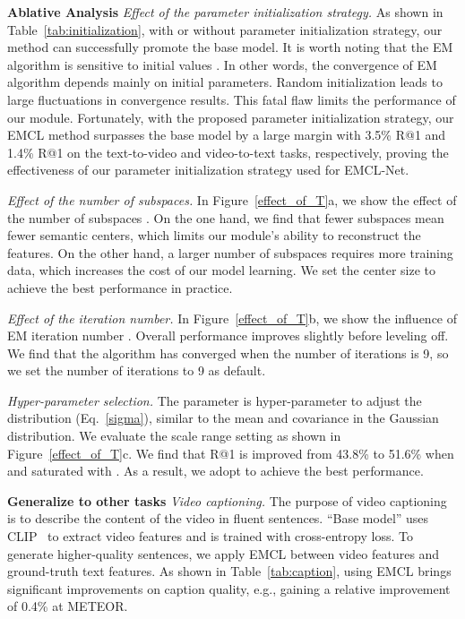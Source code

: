 \documentclass{article}
\newcommand{\myparagraph}[1]{\textbf{#1}\hspace{1.8ex}}
\newcommand{\mysubparagraph}[1]{\textit{#1}\hspace{1.8ex}}
\begin{document}
\myparagraph{Ablative Analysis}
\mysubparagraph{Effect of the parameter initialization strategy.} \label{limit}
As shown in Table~\ref{tab:initialization}, with or without parameter initialization strategy, our method can successfully promote the base model.
It is worth noting that the EM algorithm \cite{dempster1977maximum} is sensitive to initial values \cite{abdolali2021beyond,li2019expectation}. In other words, the convergence of EM algorithm depends mainly on initial parameters. Random initialization leads to large fluctuations in convergence results. This fatal flaw limits the performance of our module. Fortunately, with the proposed parameter initialization strategy, our EMCL method surpasses the base model by a large margin with 3.5\% R@1 and 1.4\% R@1 on the text-to-video and video-to-text tasks, respectively, proving the effectiveness of our parameter initialization strategy used for EMCL-Net. 

\mysubparagraph{Effect of the number of subspaces.} In Figure~\ref{effect_of_T}a, we show the effect of the number of subspaces . On the one hand, we find that fewer subspaces mean fewer semantic centers, which limits our module’s ability to reconstruct the features. On the other hand, a larger number of subspaces requires more training data, which increases the cost of our model learning. We set the center size  
to achieve the best performance in practice.

\mysubparagraph{Effect of the iteration number.} In Figure~\ref{effect_of_T}b, we show the influence of EM iteration number . Overall performance improves slightly before leveling off. We find that the algorithm has converged when the number of iterations is 9, so we set the number of iterations to 9 as default.

\mysubparagraph{Hyper-parameter selection.} The parameter  is hyper-parameter to adjust the distribution (Eq.~\ref{sigma}), similar to the mean and covariance in the Gaussian distribution. We evaluate the scale range setting  as shown in Figure~\ref{effect_of_T}c. We find that R@1 is improved from 43.8\% to 51.6\% when  and saturated with . As a result, we adopt  to achieve the best performance.

\myparagraph{Generalize to other tasks}
\mysubparagraph{Video captioning.}
The purpose of video captioning is to describe the content of the video in fluent sentences. ``Base model'' uses CLIP~\cite{radford2021learning} to extract video features and is trained with cross-entropy loss. To generate higher-quality sentences, we apply EMCL between video features and ground-truth text features.
As shown in Table~\ref{tab:caption}, using EMCL brings significant improvements on caption quality, e.g., gaining a relative improvement of 0.4\% at METEOR.
\end{document}
